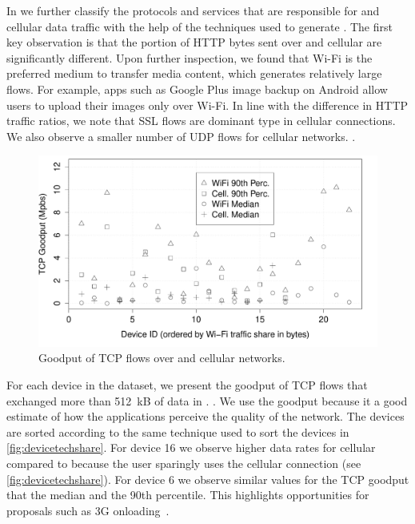 In  we further classify the protocols and services that are responsible for \wifi and cellular data traffic with the help of the techniques used to generate . 
The first key observation is that the portion of HTTP bytes sent over \wifi and cellular are significantly different. 
Upon further inspection, we found that Wi-Fi is the preferred medium to transfer media content, which generates relatively large flows. 
For example, apps such as Google Plus image backup on Android allow users to upload their
images only over Wi-Fi. 
In line with the difference in HTTP traffic ratios, we note that SSL flows are dominant type in cellular connections. 
We also observe a smaller number of UDP flows for cellular networks. 
.

\begin{figure}
\includegraphics[width=\columnwidth]{plots/deviceTechDataRate.pdf}
\caption{Goodput of TCP flows over \wifi and cellular networks.}
\label{fig:devicetechrate}
\end{figure}

For each device in the \moball dataset, we present the goodput of TCP flows that exchanged more than 512~kB of data in .
.
We use the goodput because it a good estimate of how the applications perceive the quality of the network.  
The devices are sorted according to the same technique used to sort the devices in \ref{fig:devicetechshare}.
For device 16 we observe higher data rates for cellular compared to \wifi because the user sparingly uses the cellular connection (see \ref{fig:devicetechshare}). 
For device 6 we observe similar values for the TCP goodput that the median and the 90th percentile. 
This highlights opportunities for proposals such as 3G onloading~\cite{vr:3gol}.

